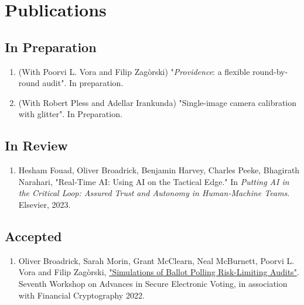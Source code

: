 \documentclass[letterpaper]{article}
\begin{document}
\section*{Publications}

\subsection*{In Preparation}
\begin{enumerate}
\item
(With Poorvi L. Vora and Filip Zag\`{o}rski) "\textit{Providence}: a flexible round-by-round audit". In preparation.
\item
(With Robert Pless and Adellar Irankunda) "Single-image camera calibration with glitter". In Preparation.
\end{enumerate}

\subsection*{In Review}
\begin{enumerate}
\item
Hesham Fouad, Oliver Broadrick, Benjamin Harvey, Charles Peeke, Bhagirath Narahari, "Real-Time AI: Using AI on the Tactical Edge." In \emph{Putting AI in the Critical Loop: Assured Trust and Autonomy in Human-Machine Teams}. Elsevier, 2023.
\end{enumerate}

\subsection*{Accepted}
\begin{enumerate}
\item Oliver Broadrick, Sarah Morin, Grant McClearn, Neal McBurnett, Poorvi L. Vora and Filip Zag\`{o}rski, \href{https://oliverbroadrick.com/papers/simulations-of-ballot-polling-rlas.pdf}{"Simulations of Ballot Polling Risk-Limiting Audits"}. Seventh Workshop on Advances in Secure Electronic Voting, in association with Financial Cryptography 2022.
\end{enumerate}

\bigskip
\end{document}
